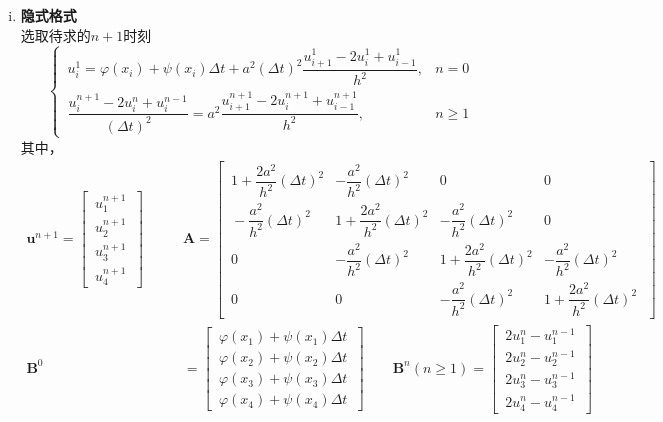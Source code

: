 \begin{enumerate}[\textbf{步骤} 1 ]
\begin{enumerate}[(1) ]
\begin{enumerate}[i. ]
			\item \textbf{隐式格式}\\
			选取待求的$n+1$时刻
			\begin{equation}
				\begin{cases}
					\, u_i^1=\varphi(x_i)+\psi(x_i)\Delta t + a^2 (\Delta t)^2\dfrac{u_{i+1}^1-2u_i^1+u_{i-1}^1}{h^2}, & n = 0\\[1em]
					\,
					\dfrac{u_i^{n+1}-2u_i^n+u_i^{n-1}}{(\Delta t)^2} = a^2 \dfrac{u_{i+1}^{n+1} - 2u_i^{n+1} + u_{i-1}^{n+1}}{h^2}, & n \ge 1
				\end{cases}
			\end{equation}
			其中，
			\begin{align}
				\bm{u}^{n+1} = 
				\begin{bmatrix}
					\, u_1^{n+1}\, \\
					\, u_2^{n+1}\, \\
					\, u_3^{n+1}\, \\
					\, u_4^{n+1}\,
				\end{bmatrix}
				\quad \quad 
				&\bm{A} =
				\begin{bmatrix}
					\, 1+\dfrac{2a^2}{h^2}(\Delta t)^2 & -\dfrac{a^2}{h^2}(\Delta t)^2 & 0 & 0\,\, \\[1em]
					\, -\dfrac{a^2}{h^2}(\Delta t)^2 & 1+\dfrac{2a^2}{h^2}(\Delta t)^2 & -\dfrac{a^2}{h^2}(\Delta t)^2 & 0 \,\, \\[1em]
					\, 0 & -\dfrac{a^2}{h^2}(\Delta t)^2 & 1+\dfrac{2a^2}{h^2}(\Delta t)^2 & -\dfrac{a^2}{h^2}(\Delta t)^2 \,\, \\[1em]
					\, 0 & 0 & -\dfrac{a^2}{h^2}(\Delta t)^2 & 1+\dfrac{2a^2}{h^2}(\Delta t)^2 \,\,
				\end{bmatrix}\\[1em]
				\bm{B}^0 &= 
				\begin{bmatrix}
					\, \varphi(x_1)+\psi(x_1)\Delta t  \,\\
					\, \varphi(x_2)+\psi(x_2)\Delta t \, \\
					\,  \varphi(x_3)+\psi(x_3)\Delta t \, \\
					\, \varphi(x_4)+\psi(x_4)\Delta t \, 
				\end{bmatrix}
				\quad \quad 
				\bm{B}^n(n\ge 1) = 
				\begin{bmatrix}
					\, 2u_1^n - u_1^{n-1} \,\\
					\,2u_2^n - u_2^{n-1} \, \\
					\,  2u_3^n - u_3^{n-1}   \, \\
					\, 2u_4^n - u_4^{n-1}  \, 
				\end{bmatrix}

\end{align}
\end{enumerate}
\end{enumerate}
\end{enumerate}
